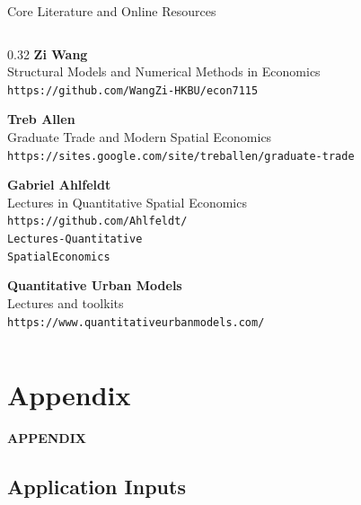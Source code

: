 \documentclass[aspectratio=169,11pt]{beamer}
\begin{document}
\begin{frame}[t]{Core Literature and Online Resources}
\begin{columns}[T,onlytextwidth]
\begin{column}{0.32\textwidth}
      \vspace{4pt}
      \textbf{Zi Wang}\\
      Structural Models and Numerical Methods in Economics\\[-1pt]
      \nolinkurl{https://github.com/WangZi-HKBU/econ7115}

      \vspace{6pt}
      \textbf{Treb Allen}\\
      Graduate Trade and Modern Spatial Economics\\[-1pt]
      \nolinkurl{https://sites.google.com/site/treballen/graduate-trade}

      \vspace{6pt}
      \textbf{Gabriel Ahlfeldt}\\
      Lectures in Quantitative Spatial Economics\\[-1pt]
      \nolinkurl{https://github.com/Ahlfeldt/}\\[-1pt]
      \nolinkurl{Lectures-Quantitative}\\[-1pt]
      \nolinkurl{SpatialEconomics}

      \vspace{6pt}
      \textbf{Quantitative Urban Models}\\
      Lectures and toolkits\\[-1pt]
      \nolinkurl{https://www.quantitativeurbanmodels.com/}
    \end{column}
  \end{columns}
\end{frame}

\appendix
\section{Appendix}

\begin{frame}[plain]
  \vfill
  \begin{center}
    {\color{oxfordblue}\LARGE\bfseries APPENDIX\par}
  \end{center}
  \vfill
\end{frame}

\subsection{Application Inputs}
\end{document}
